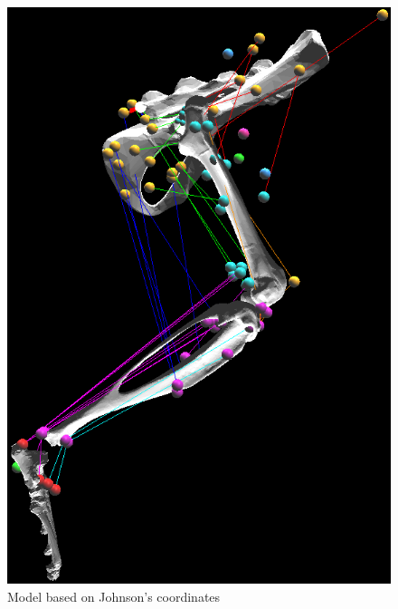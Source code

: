 \documentclass[runningheads,a4paper]{llncs}
\begin{document}
			\begin{figure}
				\centering
				\begin{minipage}{0.5\textwidth}
					\centering
					\includegraphics[width=\textwidth]{att1.PNG}
					\caption{Model based on Johnson's coordinates}
				\end{minipage}\hfill
				\begin{minipage}{0.5\textwidth}
					\centering

\end{minipage}
\end{figure}
\end{document}
